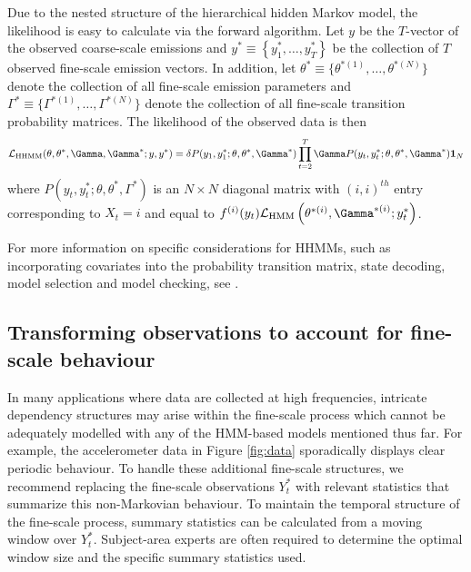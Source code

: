 Due to the nested structure of the hierarchical hidden Markov model, the likelihood is easy to calculate via the forward algorithm.
%
Let $y$ be the $T$-vector of the observed coarse-scale emissions and
$y^* \equiv \left\{y^*_1, \ldots,y^*_T\right\}$ be the collection of $T$ observed fine-scale emission vectors.
%
In addition, let $\theta^* \equiv \{\theta^{*(1)}, \ldots, \theta^{*(N)}\}$ denote the collection of all fine-scale emission parameters and $\Gamma^* \equiv \{\Gamma^{*(1)}, \ldots, \Gamma^{*(N)}\}$ denote the collection of all fine-scale transition probability matrices. The likelihood of the observed data is then
%
\[
\calL_{\text{HHMM}}(\theta,\theta^*,\Gamma,\Gamma^*;y,y^*) = \delta P(y_1,y_1^*;\theta,\theta^*,\Gamma^*) \prod_{t=2}^T \Gamma P(y_t,y_t^*;\theta,\theta^*,\Gamma^*) \mathbf{1}_N
\]
%
where $P(y_t,y_t^*;\theta,\theta^*,\Gamma^*)$ is an $N \times N$ diagonal matrix with $(i,i)^{th}$ entry corresponding to $X_t=i$ and equal to 
$f^{(i)}(y_t)\calL_{\text{HMM}}\left(\theta^{*(i)},
\Gamma^{*(i)};y_t^*\right)$. 

For more information on specific considerations for HHMMs, such as incorporating covariates into the probability transition matrix, state decoding, model selection and model checking, see \citet{Adam:2019}. 

\subsection{Transforming observations to account for fine-scale behaviour}
\label{subsec:STFT}

In many applications where data are collected at high frequencies, intricate dependency structures may arise within the fine-scale process which cannot be adequately modelled with any of the HMM-based models mentioned thus far. For example, the accelerometer data in Figure \ref{fig:data} sporadically displays clear periodic behaviour. To handle these additional fine-scale structures, we recommend replacing the fine-scale observations $Y_t^*$ with relevant statistics that summarize this non-Markovian behaviour. To maintain the temporal structure of the fine-scale process, summary statistics can be calculated from a moving window over $Y_t^*$. Subject-area experts are often required to determine the optimal window size and the specific summary statistics used. 
%
%

